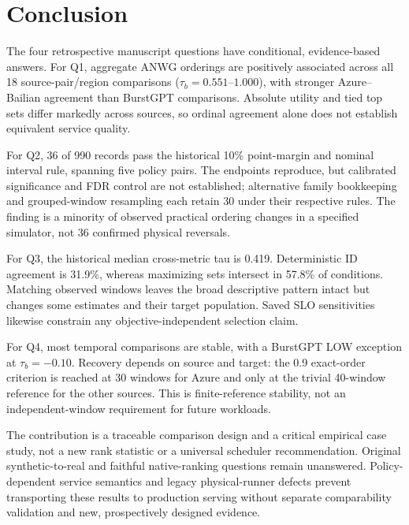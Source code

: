 \section{Conclusion}\label{sec:conclusion}
The four retrospective manuscript questions have conditional, evidence-based
answers. For Q1, aggregate ANWG orderings are positively associated across
all 18 source-pair/region comparisons ($\tau_b=0.551$--$1.000$), with
stronger Azure--Bailian agreement than BurstGPT comparisons. Absolute
utility and tied top sets differ markedly across sources, so ordinal
agreement alone does not establish equivalent service quality.

For Q2, 36 of 990 records pass the historical 10\% point-margin and nominal
interval rule, spanning five policy pairs. The endpoints reproduce, but
calibrated significance and FDR control are not established; alternative
family bookkeeping and grouped-window resampling each retain 30 under
their respective rules. The finding is a minority of observed practical
ordering changes in a specified simulator, not 36 confirmed physical
reversals.

For Q3, the historical median cross-metric tau is 0.419. Deterministic
ID agreement is 31.9\%, whereas maximizing sets intersect in 57.8\% of
conditions. Matching observed windows leaves the broad descriptive pattern
intact but changes some estimates and their target population. Saved SLO
sensitivities likewise constrain any objective-independent selection claim.

For Q4, most temporal comparisons are stable, with a BurstGPT LOW exception
at $\tau_b=-0.10$. Recovery depends on source and target: the 0.9 exact-order
criterion is reached at 30 windows for Azure and only at the trivial
40-window reference for the other sources. This is finite-reference
stability, not an independent-window requirement for future workloads.

The contribution is a traceable comparison design and a critical empirical
case study, not a new rank statistic or a universal scheduler recommendation.
Original synthetic-to-real and faithful native-ranking questions remain
unanswered. Policy-dependent service semantics and legacy physical-runner
defects prevent transporting these results to production serving without
separate comparability validation and new, prospectively designed evidence.
